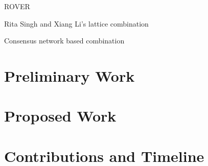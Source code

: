 \documentclass{article}
\begin{document}
ROVER \cite{fiscus1997}

Rita Singh and Xiang Li's lattice combination \cite{li2002}

Consensus network based combination \cite{mangu2000}

\section{Preliminary Work}
\label{sec:prelim}



\section{Proposed Work}
\label{sec:proposed}

\section{Contributions and Timeline}
\label{sec:contrib}





\end{document}
